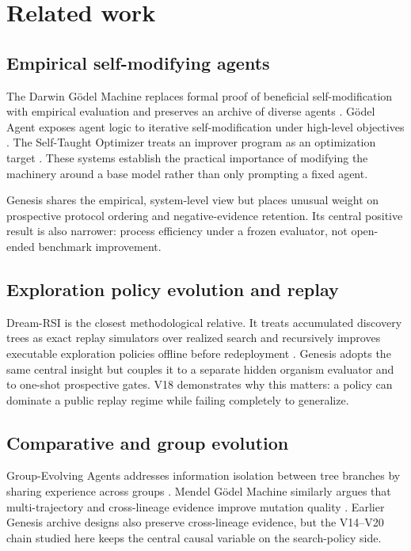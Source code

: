 \section{Related work}

\subsection{Empirical self-modifying agents}

The Darwin G\"odel Machine replaces formal proof of beneficial self-modification with empirical evaluation and preserves an archive of diverse agents \cite{zhang2025dgm}. G\"odel Agent exposes agent logic to iterative self-modification under high-level objectives \cite{yin2024godelagent}. The Self-Taught Optimizer treats an improver program as an optimization target \cite{zelikman2023stop}. These systems establish the practical importance of modifying the machinery around a base model rather than only prompting a fixed agent.

Genesis shares the empirical, system-level view but places unusual weight on prospective protocol ordering and negative-evidence retention. Its central positive result is also narrower: process efficiency under a frozen evaluator, not open-ended benchmark improvement.

\subsection{Exploration policy evolution and replay}

Dream-RSI is the closest methodological relative. It treats accumulated discovery trees as exact replay simulators over realized search and recursively improves executable exploration policies offline before redeployment \cite{zheng2026dreamrsi}. Genesis adopts the same central insight but couples it to a separate hidden organism evaluator and to one-shot prospective gates. V18 demonstrates why this matters: a policy can dominate a public replay regime while failing completely to generalize.

\subsection{Comparative and group evolution}

Group-Evolving Agents addresses information isolation between tree branches by sharing experience across groups \cite{weng2026gea}. Mendel G\"odel Machine similarly argues that multi-trajectory and cross-lineage evidence improve mutation quality \cite{liu2026mgm}. Earlier Genesis archive designs also preserve cross-lineage evidence, but the V14--V20 chain studied here keeps the central causal variable on the search-policy side.

